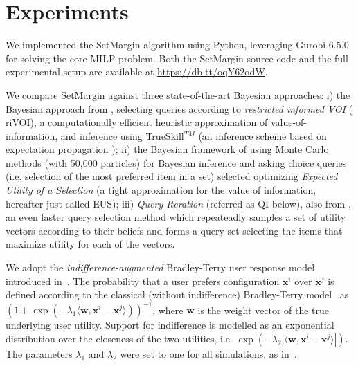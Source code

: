 \documentclass{article}
\renewcommand\[{\begin{equation}}
\renewcommand\]{\end{equation}}
\newcommand{\vecvar}[1]{\ensuremath{\boldsymbol{#1}}}
\newcommand{\vw}{\vecvar{w}}
\newcommand{\vx}{\vecvar{x}}
\begin{document}
\section{Experiments}
\label{sec:experiments}

We implemented the {\sc SetMargin} algorithm using Python, leveraging Gurobi
6.5.0 for solving the core MILP problem. Both the {\sc SetMargin} source code
and the full experimental setup are available at \url{https://db.tt/oqY62odW}.

We compare {\sc SetMargin} against three state-of-the-art Bayesian
approaches: i) the Bayesian approach from \cite{guo2010real},
selecting queries according to {\em restricted informed VOI} ({\sc
  riVOI}), a computationally efficient heuristic approximation of
value-of-information, and inference using TrueSkill$^{TM}$
\cite{HerbrichMG06} (an inference scheme based on expectation
propagation \cite{Minka01}); ii) the Bayesian framework of
\cite{viappiani2010optimal} using Monte Carlo methods (with 50,000
particles) for Bayesian inference and asking choice queries
(i.e. selection of the most preferred item in a set) selected
optimizing {\em Expected Utility of a Selection} (a tight
approximation for the value of information, hereafter just called {\sc
  EUS}); iii) {\em Query Iteration} (referred as {\sc QI} below), also
from \cite{viappiani2010optimal}, an even faster query selection
method which repeateadly samples a set of utility vectors according to
their beliefs and forms a query set selecting the items that maximize
utility for each of the vectors.

We adopt the {\em indifference-augmented} Bradley-Terry user response
model introduced in~\cite{guo2010real}. The probability that a user
prefers configuration $\vx^i$ over $\vx^j$ is defined according to the
classical (without indifference) Bradley-Terry model~\cite{BraTer52} as
$ (1 + \exp(-\lambda_1 \langle\vw,\vx^i - \vx^j\rangle))^{-1} $,
where $\vw$ is the weight vector of the true underlying user utility.
Support for indifference is modelled as an exponential distribution
over the closeness of the two utilities, i.e. 
$ \exp(-\lambda_2 |\langle\vw,\vx^i - \vx^j\rangle|).$
The parameters $\lambda_1$ and $\lambda_2$ were set to one for all
simulations, as in~\cite{guo2010real}.
\end{document}
